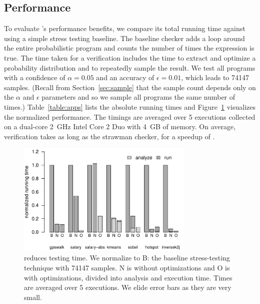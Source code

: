 \subsection{Performance}

To evaluate \tool's performance benefits,
we compare its total running time against
using a simple stress testing baseline.
The baseline checker adds a  loop around the entire
probabilistic program and counts the number of times the \passert expression
is true.
The time taken for a \tool verification includes the time to extract and
optimize a probability distribution and to repeatedly sample the
result.
We test all programs with a confidence of $\alpha = 0.05$ and an
accuracy of $\epsilon = 0.01$, which leads to 74147 samples.
(Recall from Section~\ref{sec:sample} that the sample count depends only on the
$\alpha$ and $\epsilon$ parameters and 
 so we sample all programs the
same number of times.)
Table~\ref{table:apps} lists the absolute running times and
Figure~\ref{fig:performance} visualizes the normalized performance.
The timings are averaged over 5 executions collected on a dual-core 2~GHz
Intel Core 2 Duo with 4~GB of memory.
On average, \tool verification takes  as
long as the strawman checker, for a speedup of
.


\begin{figure}
    \begin{centering}
    \includegraphics[width=8.5cm]{results/performance}
    \end{centering}
    \vspace{-2ex}
    \caption{\tool reduces testing time.  We normalize to B: the baseline
      stress-testing technique with 74147 samples. N is \tool without 
      optimizations and O is \tool with optimizations, divided into
      analysis and execution time. Times are averaged over 5 executions.
      We elide error bars as they are very small.}
    \label{fig:performance}
\end{figure}


